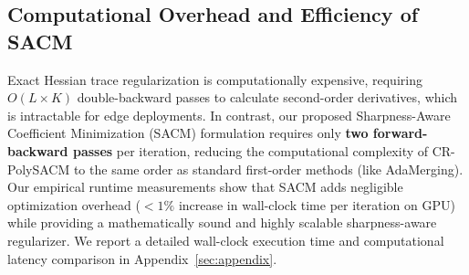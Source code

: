\subsection{Computational Overhead and Efficiency of SACM}
Exact Hessian trace regularization is computationally expensive, requiring $O(L \times K)$ double-backward passes to calculate second-order derivatives, which is intractable for edge deployments. In contrast, our proposed Sharpness-Aware Coefficient Minimization (SACM) formulation requires only \textbf{two forward-backward passes} per iteration, reducing the computational complexity of CR-PolySACM to the same order as standard first-order methods (like AdaMerging). Our empirical runtime measurements show that SACM adds negligible optimization overhead ($<1\%$ increase in wall-clock time per iteration on GPU) while providing a mathematically sound and highly scalable sharpness-aware regularizer. We report a detailed wall-clock execution time and computational latency comparison in Appendix~\ref{sec:appendix}.

